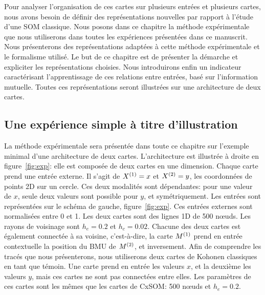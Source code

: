 Pour analyser l'organisation de ces cartes sur plusieurs entrées et plusieurs cartes, nous avons besoin de définir des représentations nouvelles par rapport à l'étude d'une SOM classique.
Nous posons dans ce chapitre la méthode expérimentale que nous utiliserons dans toutes les expériences présentées dans ce manuscrit. 
Nous présenterons des représentations adaptées à cette méthode expérimentale et le formalisme utilisé. Le but de ce chapitre est de présenter la démarche et expliciter les représentations choisies.
Nous introduirons enfin un indicateur caractérisant l'apprentissage de ces relations entre entrées, basé sur l'information mutuelle.
Toutes ces représentations seront illustrées sur une architecture de deux cartes.

\subsection{Une expérience simple à titre d'illustration}

La méthode expérimentale sera présentée dans toute ce chapitre sur l'exemple minimal d'une architecture de deux cartes. L'architecture est illustrée à droite en figure~\ref{fig:exp}: elle est composée de deux cartes en une dimension. Chaque carte prend une entrée externe. Il s'agit de $X^{({1})}=x$ et $X^{({2})}=y$, les coordonnées de points 2D sur un cercle. Ces deux modalités sont dépendantes: pour une valeur de $x$, seule deux valeurs sont possible pour $y$, et symétriquement. Les entrées sont représentées sur le schéma de gauche, figure~\ref{fig:exp}.
Ces entrées externes sont normalisées entre 0 et 1. Les deux cartes sont des lignes 1D de 500 n\oe{}uds. Les rayons de voisinage sont $h_e = 0.2$ et $h_c = 0.02$.
Chacune des deux cartes est également connectée à sa voisine, c'est-à-dire, la carte $M^{({1})}$ prend en entrée contextuelle la position du BMU de $M^{({2})}$, et inversement.
Afin de comprendre les tracés que nous présenterons, nous utiliserons deux cartes de Kohonen classiques en tant que témoin.
Une carte prend en entrée les valeurs $x$, et la deuxième les valeurs $y$, mais ces cartes ne sont pas connectées entre elles. Les paramètres de ces cartes sont les mêmes que les cartes de CxSOM: 500 n\oe{}uds et $h_e = 0.2$.

